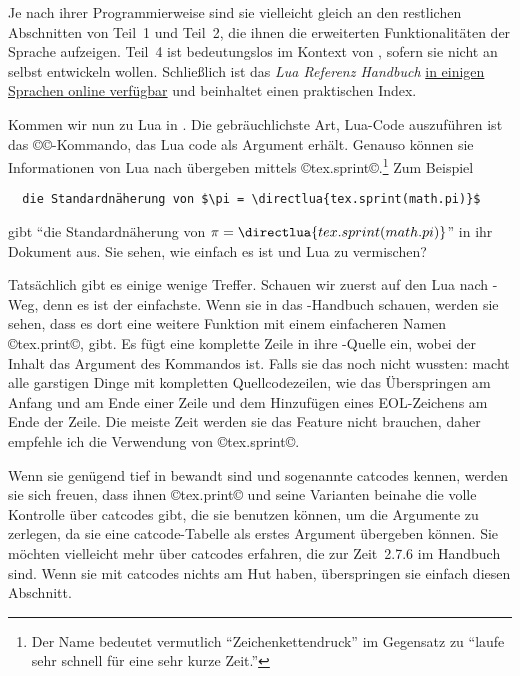 \documentclass{lltxdoc}
\begin{document}
Je nach ihrer Programmierweise sind sie vielleicht gleich an den restlichen 
Abschnitten von Teil~1 und Teil~2, die ihnen die erweiterten Funktionalitäten 
der Sprache aufzeigen. Teil~4 ist bedeutungslos im Kontext von \luatex, sofern
sie nicht an \luatex selbst entwickeln wollen. Schließlich ist das \emph{Lua
Referenz Handbuch} \href{http://www.lua.org/manual/}{in einigen Sprachen
online verfügbar} und beinhaltet einen praktischen Index.

\medskip

Kommen wir nun zu Lua in \luatex. Die gebräuchlichste Art, Lua-Code auszuführen
ist das ©\directlua©-Kommando, das Lua code als Argument erhält. Genauso können 
sie Informationen von Lua nach \tex übergeben mittels ©tex.sprint©.\footnote{
Der Name bedeutet vermutlich ``Zeichenkettendruck'' im Gegensatz zu ``laufe 
sehr schnell für eine sehr kurze Zeit.'' } Zum Beispiel

\begin{Verbatim}
  die Standardnäherung von $\pi = \directlua{tex.sprint(math.pi)}$
\end{Verbatim}

gibt ``die Standardnäherung von $\pi = \directlua{tex.sprint(math.pi)}$'' in
ihr Dokument aus. Sie sehen, wie einfach es ist \tex und Lua zu vermischen?

Tatsächlich gibt es einige wenige Treffer. Schauen wir zuerst auf den Lua 
nach \tex-Weg, denn es ist der einfachste. Wenn sie in das \luatex-Handbuch
schauen, werden sie sehen, dass es dort eine weitere Funktion mit einem 
einfacheren Namen ©tex.print©, gibt. Es fügt eine komplette Zeile
in ihre \tex-Quelle ein, wobei der Inhalt das Argument des Kommandos ist. Falls
sie das noch nicht wussten: \tex macht alle garstigen Dinge mit kompletten 
Quellcodezeilen, wie das Überspringen am Anfang und am Ende einer Zeile und dem 
Hinzufügen eines EOL-Zeichens am Ende der Zeile. Die meiste Zeit werden sie
das Feature nicht brauchen, daher empfehle ich die Verwendung von ©tex.sprint©.

Wenn sie genügend tief in \tex bewandt sind und sogenannte catcodes kennen, 
werden sie sich freuen, dass ihnen ©tex.print© und seine Varianten beinahe
die volle Kontrolle über catcodes gibt, die sie benutzen können, um die 
Argumente zu zerlegen, da sie eine catcode-Tabelle als erstes Argument 
übergeben können. Sie möchten vielleicht mehr über catcodes erfahren, die
zur Zeit~2.7.6 im \luatex Handbuch sind. Wenn sie mit catcodes nichts am
Hut haben, überspringen sie einfach diesen Abschnitt.
\end{document}
